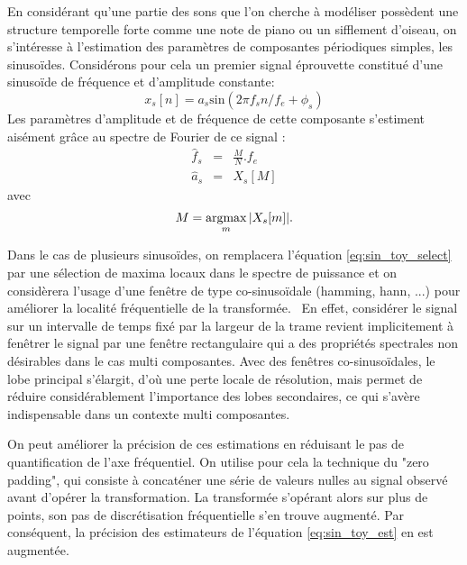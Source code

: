En considérant qu'une partie des sons que l'on cherche à modéliser possèdent une structure temporelle forte comme une note de piano ou un sifflement d'oiseau, on s'intéresse à l'estimation des paramètres de composantes périodiques simples, les sinusoïdes. Considérons pour cela un premier signal \og éprouvette \fg constitué d'une sinusoïde de fréquence et d'amplitude constante:
\begin{equation}
  x_s[n] = a_s \mathrm{sin}(2\pi f_s n /f_e + \phi_s)
  \label{eq:sin_toy}
\end{equation}
Les paramètres d'amplitude et de fréquence de cette composante s'estiment aisément grâce au spectre de Fourier de ce signal :
\begin{eqnarray}
  \hat{f}_s &=&  \frac{M}{N} . f_e\\
  \hat{a}_s &=& X_s[M]
    \label{eq:sin_toy_est}
\end{eqnarray}
avec
\begin{equation}
  M = \operatorname*{argmax}_m | X_s[m] |.
  \label{eq:sin_toy_select}
\end{equation}


Dans le cas de plusieurs sinusoïdes, on remplacera l'équation \ref{eq:sin_toy_select} par une sélection de maxima locaux dans le spectre de puissance et on considèrera l'usage d'une fenêtre de type co-sinusoïdale (hamming, hann, ...) pour améliorer la localité fréquentielle de la transformée.~\cite{harris1978use} En effet, considérer le signal sur un intervalle de temps fixé par la largeur de la trame revient implicitement à fenêtrer le signal par une fenêtre rectangulaire qui a des propriétés spectrales non désirables dans le cas multi composantes. Avec des fenêtres co-sinusoïdales, le lobe principal s'élargit, d'où une perte locale de résolution, mais permet de réduire considérablement l'importance des lobes secondaires, ce qui s'avère indispensable dans un contexte multi composantes.


On peut améliorer la précision de ces estimations en réduisant le pas de quantification de l'axe fréquentiel. On utilise pour cela la technique du "zero padding", qui consiste à concaténer une série de valeurs nulles au signal observé avant d'opérer la transformation. La transformée s'opérant alors sur plus de points, son pas de discrétisation fréquentielle s'en trouve augmenté. Par conséquent, la précision des estimateurs de l'équation \ref{eq:sin_toy_est} en est augmentée.

